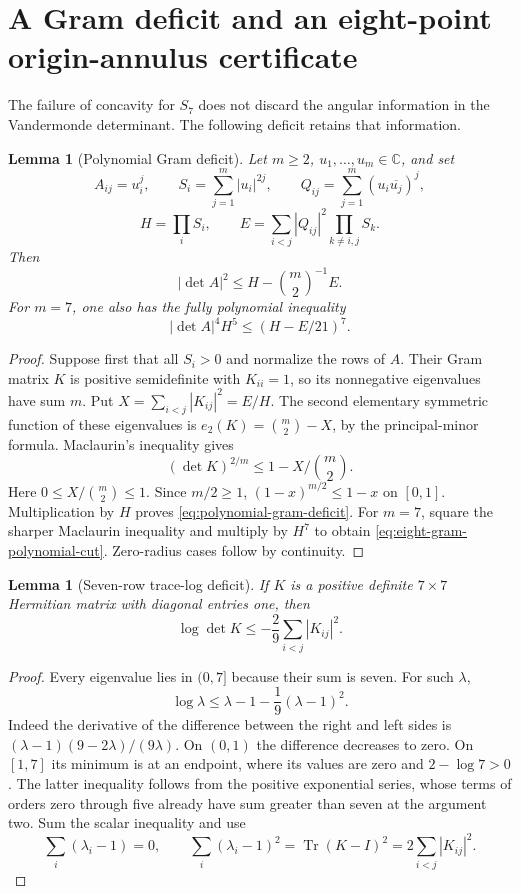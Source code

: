\documentclass[11pt]{article}
\newtheorem{lemma}[theorem]{Lemma}
\theoremstyle{remark}
\newcommand{\C}{\mathbb C}
\numberwithin{equation}{section}
\begin{document}
\section{A Gram deficit and an eight-point origin-annulus certificate}
\label{sec:eight-origin-annulus}

The failure of concavity for $S_7$ does not discard the angular information
in the Vandermonde determinant. The following deficit retains that information.
\begin{lemma}[Polynomial Gram deficit]
\label{lem:polynomial-gram-deficit}
Let $m\ge2$, $u_1,\ldots,u_m\in\C$, and set
\[
 A_{ij}=u_i^j,\qquad
 S_i=\sum_{j=1}^m|u_i|^{2j},\qquad
 Q_{ij}=\sum_{j=1}^m(u_i\overline{u_j})^j,
\]
\[
 H=\prod_iS_i,\qquad
 E=\sum_{i<j}|Q_{ij}|^2\prod_{k\ne i,j}S_k.
\]
Then
\begin{equation}\label{eq:polynomial-gram-deficit}
 |\det A|^2\le H-\binom m2^{-1}E.
\end{equation}
For $m=7$, one also has the fully polynomial inequality
\begin{equation}\label{eq:eight-gram-polynomial-cut}
 |\det A|^4H^5\le(H-E/21)^7.
\end{equation}
\end{lemma}
\begin{proof}
Suppose first that all $S_i>0$ and normalize the rows of $A$.
Their Gram matrix $K$ is positive semidefinite with $K_{ii}=1$,
so its nonnegative eigenvalues have sum $m$. Put
$X=\sum_{i<j}|K_{ij}|^2=E/H$.
The second elementary symmetric function of these eigenvalues is
$e_2(K)=\binom m2-X$, by the principal-minor formula.
Maclaurin's inequality gives
\[
 (\det K)^{2/m}\le1-X/\binom m2.
\]
Here $0\le X/\binom m2\le1$. Since $m/2\ge1$,
$(1-x)^{m/2}\le1-x$ on $[0,1]$. Multiplication by $H$ proves
\eqref{eq:polynomial-gram-deficit}. For $m=7$, square the sharper
Maclaurin inequality and multiply by $H^7$ to obtain
\eqref{eq:eight-gram-polynomial-cut}. Zero-radius cases follow
by continuity.
\end{proof}

\begin{lemma}[Seven-row trace-log deficit]
\label{lem:seven-trace-log-deficit}
If $K$ is a positive definite $7\times7$ Hermitian matrix with diagonal
entries one, then
\[
 \log\det K\le-\frac29\sum_{i<j}|K_{ij}|^2.
\]
\end{lemma}
\begin{proof}
Every eigenvalue lies in $(0,7]$ because their sum is seven.
For such $\lambda$,
\[
 \log\lambda\le\lambda-1-\frac19(\lambda-1)^2.
\]
Indeed the derivative of the difference between the right and left
sides is $(\lambda-1)(9-2\lambda)/(9\lambda)$. On $(0,1)$ the
difference decreases to zero. On $[1,7]$ its minimum is at an
endpoint, where its values are zero and $2-\log7>0$.
The latter inequality follows from the positive exponential series,
whose terms of orders zero through five already have sum greater
than seven at the argument two. Sum the scalar inequality and use
\[
 \sum_i(\lambda_i-1)=0,\qquad
 \sum_i(\lambda_i-1)^2=\operatorname{Tr}(K-I)^2
 =2\sum_{i<j}|K_{ij}|^2.
\]
\end{proof}
\end{document}
